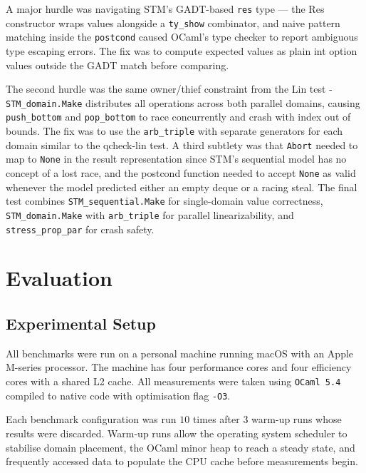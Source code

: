 \documentclass[11pt,a4paper]{article}
\begin{document}
A major hurdle was navigating STM's GADT-based \texttt{res} type — the Res
constructor wraps values alongside a \texttt{ty\_show} combinator, and naive pattern
matching inside the \texttt{postcond} caused OCaml's type checker to report ambiguous
type escaping errors. The fix was to compute expected values as plain int option
values outside the GADT match before comparing.

The second hurdle was the same owner/thief constraint from the Lin test -
\texttt{STM\_domain.Make} distributes all operations across both parallel domains,
causing \texttt{push\_bottom} and \texttt{pop\_bottom} to race concurrently
and crash with index out of bounds. The fix was to use the \texttt{arb\_triple}
with separate generators for each domain similar to the qcheck-lin test.
A third subtlety was that \texttt{Abort} needed to map to \texttt{None} in the
result representation since STM's sequential model has no concept of a lost race,
and the postcond function needed to accept \texttt{None} as valid whenever the
model predicted either an empty deque or a racing steal. The final test combines
\texttt{STM\_sequential.Make} for
single-domain value correctness, \texttt{STM\_domain.Make} with
\texttt{arb\_triple} for parallel linearizability, and
\texttt{stress\_prop\_par} for crash safety.

\section{Evaluation}
\label{sec:evaluation}

\subsection{Experimental Setup}

All benchmarks were run on a personal machine running macOS with an
Apple M-series processor. The machine has four performance cores and four
efficiency cores with a shared L2 cache. All measurements were taken using
\texttt{OCaml 5.4} compiled to native code with optimisation flag \texttt{-O3}.

Each benchmark configuration was run $10$ times after $3$ warm-up runs whose
results were discarded. Warm-up runs allow the operating system scheduler to
stabilise domain placement, the OCaml minor heap to reach a steady state, and
frequently accessed data to populate the CPU cache before measurements begin.
\end{document}
